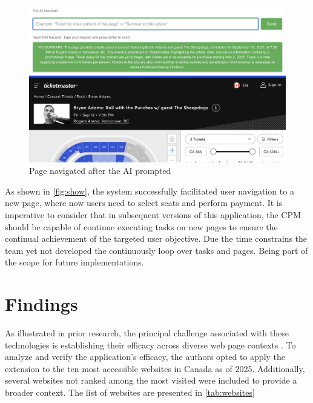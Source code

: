 \documentclass[conference]{IEEEtran}
\begin{document}
\begin{figure}[h]
\centering
\includegraphics[width=\columnwidth]{images/4.png}
\caption{Page navigated after the AI prompted}
\label{fig:show}
\end{figure}

As shown in \autoref{fig:show}, the system successfully facilitated user navigation to a new page, where now users need to select seats and perform payment. It is imperative to consider that in subsequent versions of this application, the CPM should be capable of continue executing tasks on new pages to ensure the continual achievement of the targeted user objective. Due the time constrains the team yet not developed the continuously loop over tasks and pages. Being part of the scope for future implementations.


\section{Findings}

As illustrated in prior research, the principal challenge associated with these technologies is establishing their efficacy across diverse web page contexts \cite{prakash2024, he2024webvoyager}. To analyze and verify the application's efficacy, the authors opted to apply the extension to the ten most accessible websites in Canada as of 2025. Additionally, several websites not ranked among the most visited were included to provide a broader context. The list of websites are presented in \autoref{tab:websites}
\end{document}
